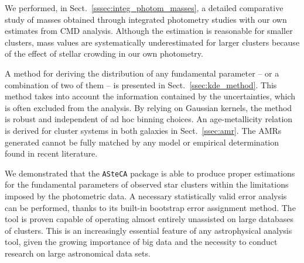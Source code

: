 \documentclass[draft]{aa}
\begin{document}
We performed, in Sect.~\ref{sssec:integ_photom_masses}, a detailed comparative
study of masses obtained through integrated photometry studies with our own
estimates from CMD analysis.
Although the estimation is reasonable for smaller clusters, mass values
are systematically underestimated for larger
clusters because of the effect of stellar crowding in our own photometry.

A method for deriving the distribution of any fundamental parameter -- or a
combination of two of them -- is presented in Sect.~\ref{ssec:kde_method}. This method
takes into account the information contained by the uncertainties, which is often
excluded from the analysis. By relying on Gaussian kernels, the method is robust and
independent of ad hoc binning choices.
%
An age-metallicity relation is derived for
cluster systems in both galaxies in Sect.~\ref{ssec:amr}. The AMRs generated
cannot be fully matched by any model or empirical determination found in recent
literature.

We demonstrated that the \texttt{ASteCA} package is able to produce proper
estimations for the fundamental parameters of observed star clusters
within the limitations imposed by the photometric data.
A necessary statistically valid error analysis
can be performed, thanks to its built-in bootstrap error assignment method.
%
The tool is proven capable of operating almost entirely unassisted on large
databases of clusters. This is an increasingly essential feature
of any astrophysical analysis tool, given the growing importance of big data and
the necessity to conduct research on large astronomical data sets.




\end{document}
